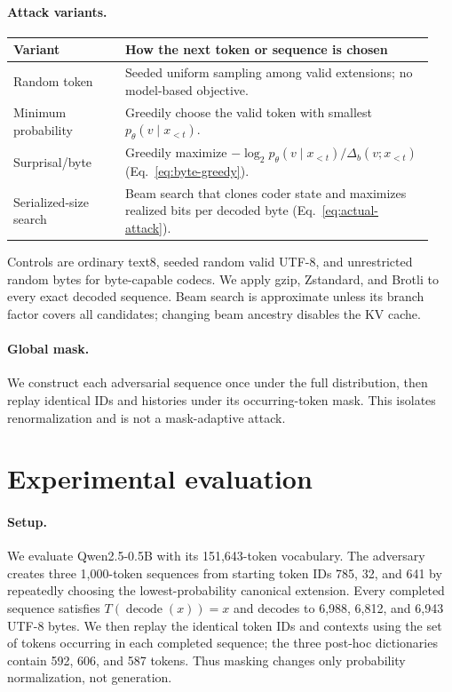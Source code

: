 \documentclass{article}
\begin{document}
\paragraph{Attack variants.}
\begin{center}
\small
\begin{tabular}{@{}p{0.25\linewidth}p{0.69\linewidth}@{}}
\toprule
Variant & How the next token or sequence is chosen \\
\midrule
Random token & Seeded uniform sampling among valid extensions; no model-based objective. \\
Minimum probability & Greedily choose the valid token with smallest $p_\theta(v\mid x_{<t})$. \\
Surprisal/byte & Greedily maximize $-\log_2p_\theta(v\mid x_{<t})/\Delta_b(v;x_{<t})$ (Eq.~\ref{eq:byte-greedy}). \\
Serialized-size search & Beam search that clones coder state and maximizes realized bits per decoded byte (Eq.~\ref{eq:actual-attack}). \\
\bottomrule
\end{tabular}
\end{center}
Controls are ordinary text8, seeded random valid UTF-8, and unrestricted random
bytes for byte-capable codecs. We apply gzip, Zstandard, and Brotli to every exact
decoded sequence. Beam search is approximate unless its branch factor covers all
candidates; changing beam ancestry disables the KV cache.

\paragraph{Global mask.}
We construct each adversarial sequence once under the full distribution, then
replay identical IDs and histories under its occurring-token mask. This isolates
renormalization and is not a mask-adaptive attack.

\section{Experimental evaluation}
\label{sec:design}

\paragraph{Setup.}
We evaluate Qwen2.5-0.5B with its 151,643-token vocabulary. The adversary creates
three 1,000-token sequences from starting token IDs 785, 32, and 641 by repeatedly
choosing the lowest-probability canonical extension. Every completed sequence
satisfies $T(\operatorname{decode}(x))=x$ and decodes to 6,988, 6,812, and 6,943 UTF-8 bytes. We then
replay the identical token IDs and contexts using the set of tokens occurring in
each completed sequence; the three post-hoc dictionaries contain 592, 606, and
587 tokens. Thus masking changes only probability normalization, not generation.
\end{document}
